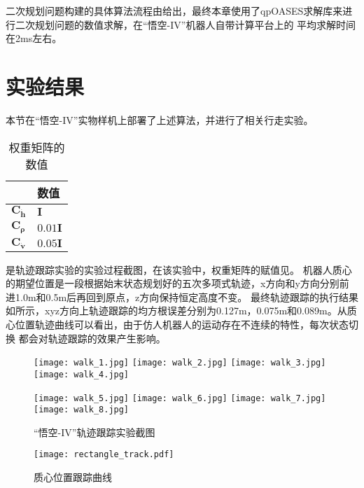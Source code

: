 二次规划问题构建的具体算法流程由给出，最终本章使用了qpOASES求解库\cite{ferreau2014qpoases}来进行二次规划问题的数值求解，在“悟空-IV”机器人自带计算平台上的
平均求解时间在2ms左右。
\section{实验结果}
\label{sec:controller_exp}
本节在“悟空-IV”实物样机上部署了上述算法，并进行了相关行走实验。
\begin{table}[htbp]
	\centering
	\caption{权重矩阵的数值}
	\label{tab:qp_weight}
	\begin{tabular}{m{2cm}<{\centering}m{2cm}<{\centering}}
		\toprule  %
		\fangsong{参数名称}   &数值  \\
		\midrule  %
		${{\boldsymbol{C}}_{{\dot{\boldsymbol{h}}}}}$    & $\mathbf{I}$\\
		${\boldsymbol{{C}}_{\boldsymbol{\rho} }}$ &  $0.01 \mathbf{I}$ \\
		${\boldsymbol{C}_{{\dot{\boldsymbol{v}}}}}$ & $0.05 \mathbf{I}$ \\
		\bottomrule %
	\end{tabular}
\end{table}
是轨迹跟踪实验的实验过程截图，在该实验中，权重矩阵的赋值见。
机器人质心的期望位置是一段根据始末状态规划好的五次多项式轨迹，x方向和y方向分别前进1.0m和0.5m后再回到原点，z方向保持恒定高度不变。
最终轨迹跟踪的执行结果如所示，xyz方向上轨迹跟踪的均方根误差分别为0.127m，0.075m和0.089m。从质心位置轨迹曲线可以看出，由于仿人机器人的运动存在不连续的特性，每次状态切换
都会对轨迹跟踪的效果产生影响。
\begin{figure}[htbp]
    \centering
    \texttt{[image: walk\_1.jpg]}
    \texttt{[image: walk\_2.jpg]}
    \texttt{[image: walk\_3.jpg]}
    \texttt{[image: walk\_4.jpg]}

    \texttt{[image: walk\_5.jpg]}
    \texttt{[image: walk\_6.jpg]}
    \texttt{[image: walk\_7.jpg]}
    \texttt{[image: walk\_8.jpg]}   
    \caption{\label{fig:track_exp}“悟空-IV”轨迹跟踪实验截图}
\end{figure}
\begin{figure}[htbp]
    \centering
    \texttt{[image: rectangle\_track.pdf]}
    \caption{\label{fig:com_pos_track}质心位置跟踪曲线}
\end{figure}

